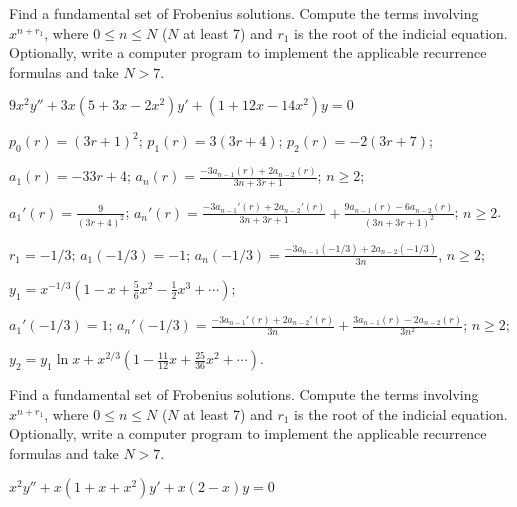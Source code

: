 \documentclass{ximera}
\begin{document}
\begin{problem}\label{exer:7.6.6}
Find a fundamental set of Frobenius solutions. Compute the terms involving $x^{n+r_1}$, where $0\leq n \leq N$ ($N$ at least 7) and $r_1$ is the root of the indicial equation. Optionally, write a computer
program to implement the applicable recurrence formulas and take $N > 7$.

$9x^2y''+3x(5+3x-2x^2)y'+(1+12x-14x^2)y=0$

\begin{solution}
    $p_0(r)=(3r+1)^2$;
$p_1(r)=3(3r+4)$;
$p_2(r)=-2(3r+7)$;

$a_1(r)=-{3}{3r+4}$;
$a_n(r)=
\frac{-3a_{n-1}(r)+2a_{n-2}(r)}{3n+3r+1}$;
$n\geq 2$;

$a_1'(r)=\frac{9}{(3r+4)^2}$;
$a_n'(r)=\frac
{-3a_{n-1}'(r)+2a_{n-2}'(r)}{3n+3r+1}
+\frac{9a_{n-1}(r)-6a_{n-2}(r)}{(3n+3r+1)^2}$;
$n\geq 2$.

$r_1=-1/3$;
$a_1(-1/3)=-1$;
$a_n(-1/3)=\frac
{-3a_{n-1}(-1/3)+2a_{n-2}(-1/3)}{3n}$,
$n\geq 2$;

$y_1=x^{-1/3}\left(1-x+\frac{5}{6}x^2-\frac{1}{2}x^3+\cdots\right)$;

$a_1'(-1/3)=1$;
$a_n'(-1/3)=\frac
{-3a_{n-1}'(r)+2a_{n-2}'(r)}{3n}
+\frac{3a_{n-1}(r)-2a_{n-2}(r)}{3n^2}$;
$n\geq 2$;

$y_2=
y_1\ln x+x^{2/3}\left(1-\frac{11}{12}x+\frac{25}{36}x^2+
\cdots\right)$.


\end{solution}
\end{problem}

\begin{problem}\label{exer:7.6.7}
Find a fundamental set of Frobenius solutions. Compute the terms involving $x^{n+r_1}$, where $0\leq n \leq N$ ($N$ at least 7) and $r_1$ is the root of the indicial equation. Optionally, write a computer
program to implement the applicable recurrence formulas and take $N > 7$. 

$x^2y''+x(1+x+x^2)y'+x(2-x)y=0$
\end{problem}
\end{document}
